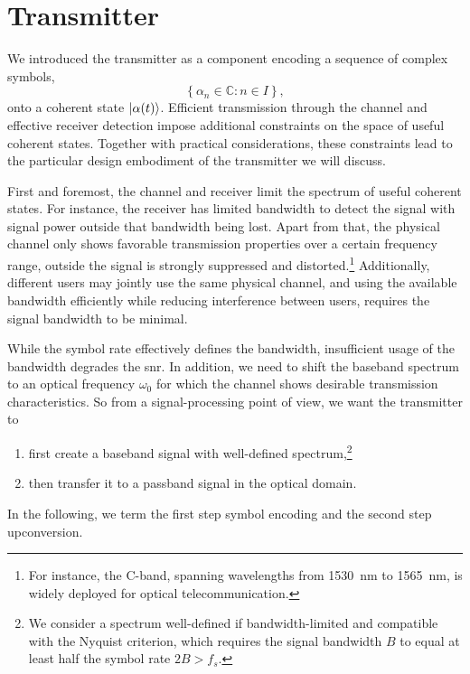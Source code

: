 \section{Transmitter}                                                                                                                                                                                                                                                                                                                                                                                                                                                                                                                                                                                                                                                                                                                     

We introduced the transmitter as a component encoding a sequence of complex symbols,
\begin{equation}
	\left\{
		\alpha_n\in\mathbb{C}
		\colon
		n\in I
	\right\}
	,
\end{equation}
onto a coherent state $\lvert\alpha(t)\rangle$.
Efficient transmission through the channel and effective receiver detection impose additional constraints on the space of useful coherent states.
Together with practical considerations, these constraints lead to the particular design embodiment of the transmitter we will discuss.

First and foremost, the channel and receiver limit the spectrum of useful coherent states.
For instance, the receiver has limited bandwidth to detect the signal with signal power outside that bandwidth being lost.
Apart from that, the physical channel only shows favorable transmission properties over a certain frequency range, outside the signal is strongly suppressed and distorted.\footnote{For instance, the C-band, spanning wavelengths from \SI{1530}{\nano\meter} to \SI{1565}{\nano\meter}, is widely deployed for optical telecommunication.}
Additionally, different users may jointly use the same physical channel, and using the available bandwidth efficiently while reducing interference between users, requires the signal bandwidth to be minimal.

While the symbol rate effectively defines the bandwidth, insufficient usage of the bandwidth degrades the \gls{snr}.
In addition, we need to shift the baseband spectrum to an optical frequency $\omega_0$ for which the channel shows desirable transmission characteristics.
So from a signal-processing point of view, we want the transmitter to
\begin{enumerate}
	\item first create a baseband signal with well-defined spectrum,\footnote{We consider a spectrum well-defined if bandwidth-limited and compatible with the Nyquist criterion, which requires the signal bandwidth $B$ to equal at least half the symbol rate $2B>f_s$.}
	\item then transfer it to a passband signal in the optical domain.
\end{enumerate}
In the following, we term the first step symbol encoding and the second step upconversion.

